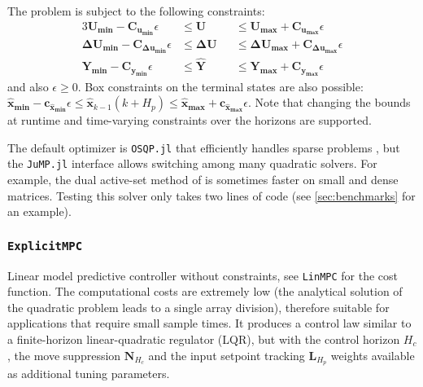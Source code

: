 The problem is subject to the following constraints:
\begin{alignat}{3}
    \mathbf{U_{min}  - C_{u_{min}}}  \epsilon &\le \mathbf{U}  &&\le \mathbf{U_{max}  + C_{u_{max}}}  \epsilon \\
    \mathbf{ΔU_{min} - C_{Δu_{min}}} \epsilon &\le \mathbf{ΔU} &&\le \mathbf{ΔU_{max} + C_{Δu_{max}}} \epsilon \\
    \mathbf{Y_{min}  - C_{y_{min}}}  \epsilon &\le \mathbf{\hat{Y}} &&\le \mathbf{Y_{max}  + C_{y_{max}}}  \epsilon
\end{alignat}
and also $\epsilon \ge 0$. Box constraints on the terminal states are also possible: $\mathbf{\hat{x}_{min}} {-} \mathbf{c_{\hat{x}_{min}}}\epsilon \le \mathbf{\hat{x}}_{k-1}(k{+}H_p) \le \mathbf{\hat{x}_{max}} + \mathbf{c_{\hat{x}_{max}}}\epsilon$. Note that changing the bounds at runtime and time-varying constraints over the horizons are supported.

The default optimizer is \texttt{OSQP.jl} that efficiently handles sparse problems \citep{osqp}, but the \texttt{JuMP.jl} interface allows switching among many quadratic solvers. For example, the dual active-set method of \citet{daqp} is sometimes faster on small and dense matrices. Testing this solver only takes two lines of code (see \cref{sec:benchmarks} for an example).

\subsubsection{\textnormal{\texttt{ExplicitMPC}}}
Linear model predictive controller without constraints, see \texttt{LinMPC} for the cost function. The computational costs are extremely low (the analytical solution of the quadratic problem leads to a single array division), therefore suitable for applications that require small sample times. It produces a control law similar to a finite-horizon linear-quadratic regulator (LQR), but with the control horizon $H_c$, the move suppression $\mathbf{N}_{H_c}$ and the input setpoint tracking $\mathbf{L}_{H_p}$ weights available as additional tuning parameters.

